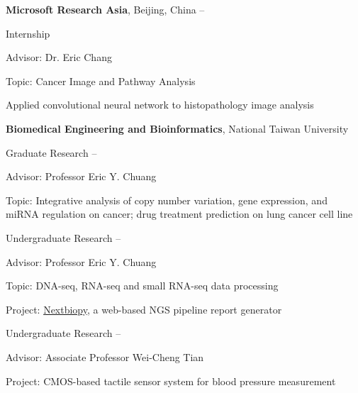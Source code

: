 \documentclass[a4paper,12pt,oneside]{article}
\begin{document}
\begin{body}
\BigEntryGapNoBreak
\textbf{Microsoft Research Asia},
Beijing, China
\hfill
{} --
\par
Internship
\begin{detail}
    \begin{detailitem}
    \item Advisor: Dr. Eric Chang
    \item Topic: Cancer Image and Pathway Analysis
    \item Applied convolutional neural network to histopathology image analysis
    \end{detailitem}
\end{detail}


\BigEntryGapNoBreak
\textbf{Biomedical Engineering and Bioinformatics},
National Taiwan University
\par
Graduate Research
\hfill
{} --
\begin{detailitem}
    \item Advisor: Professor Eric Y. Chuang
    \item Topic: Integrative analysis of copy number variation, gene expression, and miRNA regulation on cancer; drug treatment prediction on lung cancer cell line
\end{detailitem}


\EntryGapNoBreak
Undergraduate Research%
\hfill
{} --
\begin{detail}
    \begin{detailitem}
    \item Advisor: Professor Eric Y. Chuang
    \item Topic: DNA-seq, RNA-seq and small RNA-seq data processing
    \item Project: \href{https://github.com/BioCloud-TW/nextbiopy}{Nextbiopy}, a web-based NGS pipeline report generator
    \end{detailitem}
\end{detail}

\EntryGapNoBreak
Undergraduate Research%
\hfill
{} --
\begin{detail}
    \begin{detailitem}
    \item Advisor: Associate Professor Wei-Cheng Tian
    \item Project: CMOS-based tactile sensor system for blood pressure measurement
    \end{detailitem}
\end{detail}



\end{body}
\end{document}
